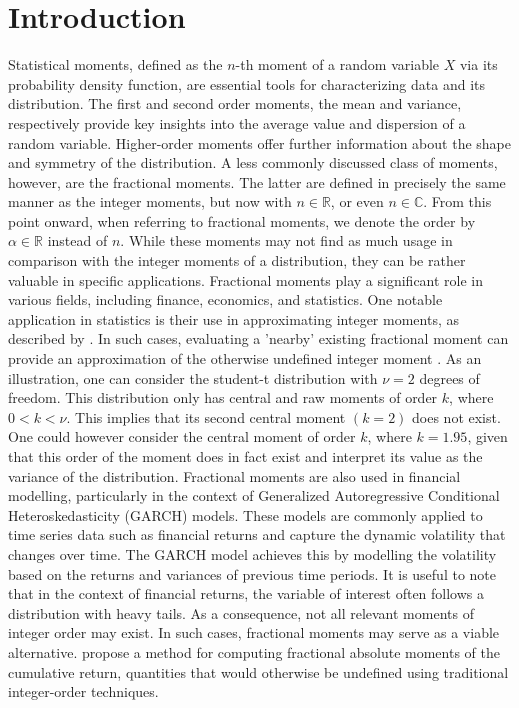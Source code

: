\section{Introduction}\label{s:intro}
Statistical moments, defined as the \(n\)-th moment of a random variable \(X\) via its probability density function, are essential tools for characterizing data and its distribution. The first and second order moments, the mean and variance, respectively provide key insights into the average value and dispersion of a random variable. Higher-order moments offer further information about the shape and symmetry of the distribution. A less commonly discussed class of moments, however, are the fractional moments. The latter are defined in precisely the same manner as the integer moments, but now with \(n \in \mathbb{R}\), or even \(n \in \mathbb{C}\). From this point onward, when referring to fractional moments, we denote the order by \(\alpha \in \mathbb{R}\) instead of \(n\). While these moments may not find as much usage in comparison with the integer moments of a distribution, they can be rather valuable in specific applications.
\newline
Fractional moments play a significant role in various fields, including finance, economics, and statistics. One notable application in statistics is their use in approximating integer moments, as described by \cite{inverardi2024}. In such cases, evaluating a 'nearby' existing fractional moment can provide an approximation of the otherwise undefined integer moment \cite{inverardi2024}.
\newline
As an illustration, one can consider the student-t distribution with \(\nu = 2\) degrees of freedom. This distribution only has central and raw moments of order \(k\), where \( 0 < k < \nu\). This implies that its second central moment \((k = 2)\) does not exist. One could however consider the central moment of order \(k\), where \(k = 1.95\), given that this order of the moment does in fact exist and interpret its value as the variance of the distribution. 
\newline
Fractional moments are also used in financial modelling, particularly in the context of Generalized Autoregressive Conditional Heteroskedasticity (GARCH) models. These models are commonly applied to time series data such as financial returns and capture the dynamic volatility that changes over time. The GARCH model achieves this by modelling the volatility based on the returns and variances of previous time periods. It is useful to note that in the context of financial returns, the variable of interest often follows a distribution with heavy tails. As a consequence, not all relevant moments of integer order may exist. In such cases, fractional moments may serve as a viable alternative.  \cite{hansen2024} propose a method for computing fractional absolute moments of the cumulative return, quantities that would otherwise be undefined using traditional integer-order techniques. 
